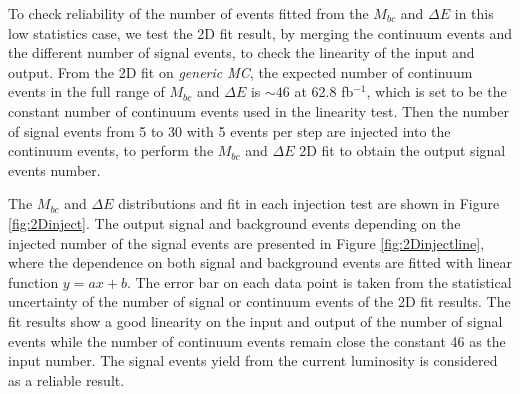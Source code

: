  
To check reliability of the number of events fitted from the $M_{bc}$ and $\Delta E$ in this low statistics case, we test the 2D fit result, by merging the continuum events and the different number of signal events, to check the linearity of the input and output. From the 2D fit on \textit{generic MC}, the expected number of continuum events in the full range of $M_{bc}$ and $\Delta E$ is $\sim 46$ at 62.8 fb$^{-1}$, which is set to be the constant number of continuum events used in the linearity test. Then the number of signal events from 5 to 30 with 5 events per step are injected into the continuum events, to perform the $M_{bc}$ and $\Delta E$ 2D fit to obtain the output signal events number.

The $M_{bc}$ and $\Delta E$ distributions and fit in each injection test are shown in Figure \ref{fig:2Dinject}. The output signal and background events depending on the injected number of the signal events are presented in Figure \ref{fig:2Dinjectline}, where the dependence on both signal and background events are fitted with linear function $y = ax+b$. The error bar on each data point is taken from the statistical uncertainty of the number of signal or continuum events of the 2D fit results. The fit results show a good linearity on the input and output of the number of signal events while the number of continuum events remain close the constant 46 as the input number. The signal events yield from the current luminosity is considered as a reliable result. 


